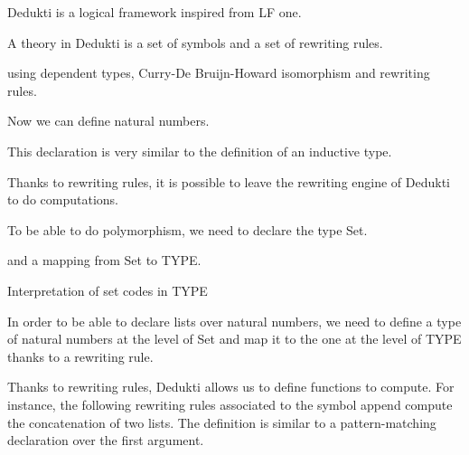 \documentclass{article}
\begin{document}
	Dedukti is a logical framework inspired from LF one.
	
	A theory in Dedukti is a set of symbols and a set of rewriting rules.
	
	using dependent types, Curry-De Bruijn-Howard isomorphism and rewriting rules.
	

	
	
	Now we can define natural numbers.
	
	
	
	This declaration is very similar to the definition of an inductive type.
	
	Thanks to rewriting rules, it is possible to leave the rewriting engine of Dedukti to do computations.
	
	To be able to do polymorphism, we need to declare the type \textsf{Set}.
	
	
	
	and a mapping from \textsf{Set} to TYPE.
	
	Interpretation of set codes in TYPE
	
	
	
	
	
	
	
	
	
	
	
	In order to be able to declare lists over natural numbers, we need to define a type of natural numbers at the level of \textsf{Set} and map it to the one at the level of TYPE thanks to a rewriting rule.
	
	
	
	
	Thanks to rewriting rules, Dedukti allows us to define functions to compute.
	For instance, the following rewriting rules associated to the symbol \textsf{append} compute the concatenation of two lists.
	The definition is similar to a pattern-matching declaration over the first argument.
	
	
	
\end{document}
